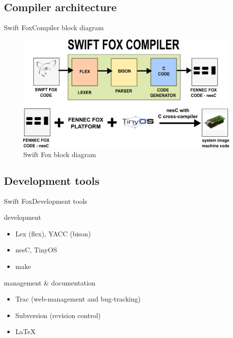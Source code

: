 \documentclass{beamer}
\begin{document}
\subsection[Compiler architecture]{Compiler architecture}

\begin{frame}{Swift Fox}{Compiler block diagram}
	\begin{figure}
		\begin{center}
		\includegraphics[scale=0.1]{fig/arch.pdf}
		\end{center}
		\caption{Swift Fox block diagram}
	\end{figure} 
\end{frame}

\subsection[Development]{Development tools}

\begin{frame}{Swift Fox}{Development tools}
	\begin{block}{development}
		\begin{itemize}
		\item Lex (flex), YACC (bison) 
		\item nesC, TinyOS
		\item make
		\end{itemize}
	\end{block}
	\begin{block}{management \& documentation}
		\begin{itemize}
		\item Trac (web-management and bug-tracking)
		\item Subversion (revision control)
		\item \LaTeX
		\end{itemize}
	\end{block}
\end{frame}
\end{document}
